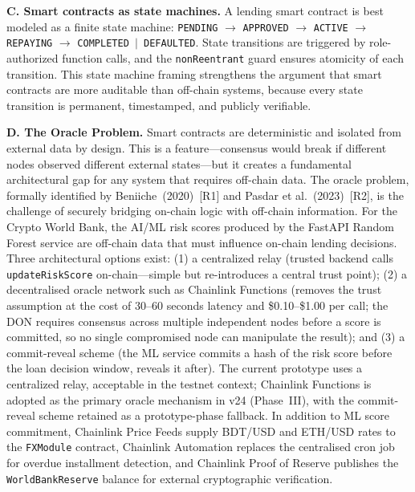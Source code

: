 \documentclass[12pt,a4paper]{report}
\begin{document}
\textbf{C. Smart contracts as state machines.}
A lending smart contract is best modeled as a finite state machine: \texttt{PENDING} $\to$ \texttt{APPROVED} $\to$ \texttt{ACTIVE} $\to$ \texttt{REPAYING} $\to$ \texttt{COMPLETED $|$ DEFAULTED}. State transitions are triggered by role-authorized function calls, and the \texttt{nonReentrant} guard ensures atomicity of each transition. This state machine framing strengthens the argument that smart contracts are more auditable than off-chain systems, because every state transition is permanent, timestamped, and publicly verifiable.

\textbf{D. The Oracle Problem.}
Smart contracts are deterministic and isolated from external data by design. This is a feature---consensus would break if different nodes observed different external states---but it creates a fundamental architectural gap for any system that requires off-chain data. The oracle problem, formally identified by Beniiche~(2020)~[R1] and Pasdar et al.~(2023)~[R2], is the challenge of securely bridging on-chain logic with off-chain information. For the Crypto World Bank, the AI/ML risk scores produced by the FastAPI Random Forest service are off-chain data that must influence on-chain lending decisions. Three architectural options exist: (1) a centralized relay (trusted backend calls \texttt{updateRiskScore} on-chain---simple but re-introduces a central trust point); (2) a decentralised oracle network such as Chainlink Functions (removes the trust assumption at the cost of 30--60 seconds latency and \$0.10--\$1.00 per call; the DON requires consensus across multiple independent nodes before a score is committed, so no single compromised node can manipulate the result); and (3) a commit-reveal scheme (the ML service commits a hash of the risk score before the loan decision window, reveals it after). The current prototype uses a centralized relay, acceptable in the testnet context; Chainlink Functions is adopted as the primary oracle mechanism in v24 (Phase~III), with the commit-reveal scheme retained as a prototype-phase fallback. In addition to ML score commitment, Chainlink Price Feeds supply BDT/USD and ETH/USD rates to the \texttt{FXModule} contract, Chainlink Automation replaces the centralised cron job for overdue installment detection, and Chainlink Proof of Reserve publishes the \texttt{WorldBankReserve} balance for external cryptographic verification.
\end{document}

